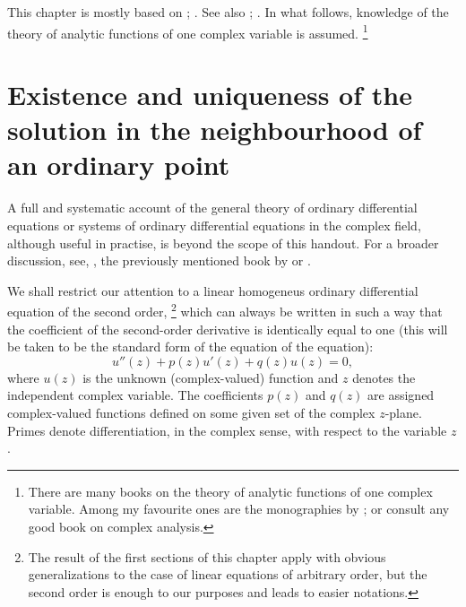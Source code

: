 This chapter is mostly based on \textcite[\S~V]{Tricomi:1961};
\textcite[\S~2]{Wang.Guo:1989}. See also \textcite[\S~V]{Smirnov:1964};
\textcite[\S~X]{Whittaker.Watson:1927}.  In what follows, knowledge of
the theory of analytic  functions of one complex variable is assumed.%
\footnote{%
   There are many books on the theory of analytic functions of one complex
   variable.  Among my favourite ones are the monographies by
   \textcite{Ablowitz.Fokas:2003,Stein.Shakarchi:2003,Marsden.Hoffman:1987,Greene.Krantz:2006};
   or consult any good book on complex analysis.}



\section[Solution in the neighbourhood of an ordinary point]{Existence and
   uniqueness of the solution in the neighbourhood of an ordinary
   point}\label{sec:existence}


A full and systematic account of the general theory of ordinary differential
equations or systems of ordinary differential equations in the complex field,
although useful in practise, is beyond the scope of this handout. For a broader
discussion, see, \eg, the previously mentioned book by \textcite{Tricomi:1961}
or \textcite{Ince:1956}.


We  shall restrict our attention to a linear homogeneus
ordinary differential equation of the second order,%
\footnote{%
   The result of the first sections of this chapter apply with obvious
   generalizations to the case of linear equations of arbitrary order, but
   the second order is enough to our purposes and leads to easier
   notations.
}
which can always be written in such a way that the coefficient of the
second-order derivative is identically equal to one (this will be taken to be
the standard form of the equation of the equation):
\begin{dmath}[label={ode}, frame]
   u'' (z) + p(z) u'(z) + q(z) u(z) = 0 ,
\end{dmath}
where $u(z)$ is the unknown (complex-valued) function and $z$ denotes the
independent complex variable. The coefficients $p(z)$ and $q(z)$ are assigned
complex-valued functions defined on some given set of the complex $z$-plane.
Primes denote differentiation, in the complex sense,
with respect to the variable $z$.

